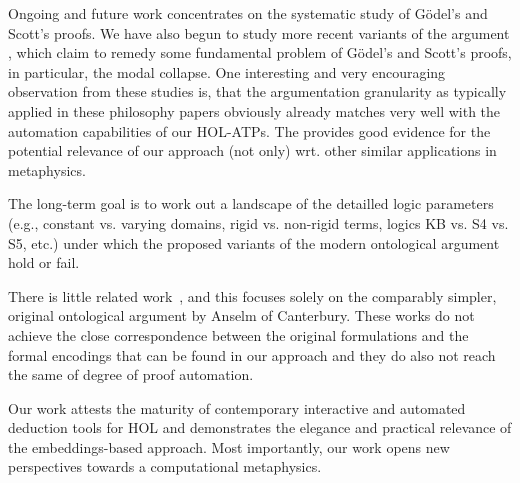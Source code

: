 \documentclass{llncs}
\begin{document}
Ongoing and future work concentrates on the systematic study of
G\"odel's and Scott's proofs. We have also begun to study more recent
variants of the argument
\cite{anderson90:_some_emend_of_goedel_ontol_proof,AndersonGettings,bjordal99,fuhrmann05:_exist_notwen,fitting02:_types_tableaus_god,Hajek2002,Hajek2008},
which claim to remedy some fundamental problem of G\"odel's and
Scott's proofs, in particular, the modal collapse.  One interesting
and very encouraging observation from these studies is, that the
argumentation granularity as typically applied in these philosophy
papers obviously already matches very well with the automation capabilities of our
HOL-ATPs. The provides good evidence for the potential relevance of our
approach (not only) wrt. other similar applications in metaphysics.


The long-term goal
is to work out a landscape of the detailled logic parameters (e.g.,
constant vs. varying domains, rigid vs. non-rigid terms, logics KB vs.
S4 vs.  S5, etc.) under which the proposed variants of the modern
ontological argument hold or fail.

There is little related work~\cite{oppenheimera11,rushby13}, and this
focuses solely on the comparably simpler, original ontological
argument by Anselm of Canterbury.  These works do not achieve the
close correspondence between the original formulations and the formal
encodings that can be found in our approach and they do also not reach
the same of degree of proof automation.

Our work attests the maturity of contemporary interactive and
automated deduction tools for HOL and
demonstrates the elegance and practical relevance of the
embeddings-based approach. Most importantly, our work opens new
perspectives towards a computational metaphysics.






%
\end{document}
